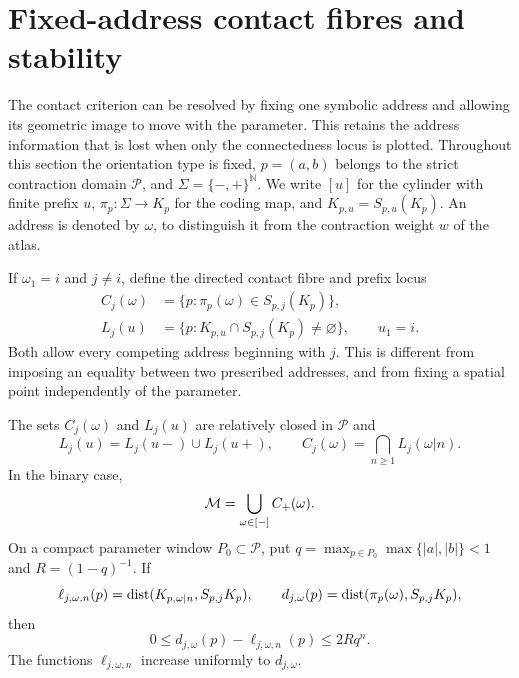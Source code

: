 
\section{Fixed-address contact fibres and stability}
\label{sec:fixed-address-fibres}

The contact criterion can be resolved by fixing one symbolic address and
allowing its geometric image to move with the parameter. This retains the
address information that is lost when only the connectedness locus is plotted.
Throughout this section the orientation type is fixed, $p=(a,b)$ belongs to
the strict contraction domain $\mathcal P$, and
$\Sigma=\{-,+\}^{\mathbb N}$. We write $[u]$ for the cylinder with finite
prefix $u$, $\pi_p:\Sigma\to K_p$ for the coding map, and
$K_{p,u}=S_{p,u}(K_p)$. An address is denoted by $\omega$, to distinguish it
from the contraction weight $w$ of the atlas.

If $\omega_1=i$ and $j\ne i$, define the directed contact fibre and prefix locus
\begin{align}
 C_j(\omega)&=\{p:\pi_p(\omega)\in S_{p,j}(K_p)\},
 \label{eq:directed-contact-fibre}\\
 L_j(u)&=\{p:K_{p,u}\cap S_{p,j}(K_p)\ne\varnothing\},\qquad u_1=i.
 \label{eq:prefix-contact-locus}
\end{align}
Both allow every competing address beginning with $j$. This is different
from imposing an equality between two prescribed addresses, and from fixing
a spatial point independently of the parameter.

\begin{theorem}
\label{thm:symbolic-contact-resolution}
The sets $C_j(\omega)$ and $L_j(u)$ are relatively closed in $\mathcal P$ and
\begin{equation}\label{eq:prefix-filtration-port}
 L_j(u)=L_j(u-)\cup L_j(u+),\qquad
 C_j(\omega)=\bigcap_{n\ge1}L_j(\omega|n).
\end{equation}
In the binary case,
\begin{equation}\label{eq:atlas-union-of-fibres}
 \mathcal M=\bigcup_{\omega\in[-]} C_+(\omega).
\end{equation}
On a compact parameter window $P_0\subset\mathcal P$, put
$q=\max_{p\in P_0}\max\{|a|,|b|\}<1$ and $R=(1-q)^{-1}$. If
\[
 \ell_{j,\omega,n}(p)=\operatorname{dist}(K_{p,\omega|n},S_{p,j}K_p),\qquad
 d_{j,\omega}(p)=\operatorname{dist}(\pi_p(\omega),S_{p,j}K_p),
\]
then
\begin{equation}\label{eq:uniform-prefix-distance}
 0\le d_{j,\omega}(p)-\ell_{j,\omega,n}(p)\le2Rq^n.
\end{equation}
The functions $\ell_{j,\omega,n}$ increase uniformly to $d_{j,\omega}$.
\end{theorem}

